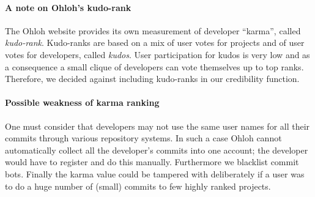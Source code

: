 \paragraph{A note on Ohloh's kudo-rank}
The Ohloh website provides its own measurement of developer ``karma'', called \emph{kudo-rank}. Kudo-ranks are based on a mix of user votes for projects and of user votes for developers, called \emph{kudos}. User participation for kudos is very low and as a consequence a small clique of developers can vote themselves up to top ranks. Therefore, we decided against including kudo-ranks in our credibility function.

\paragraph{Possible weakness of karma ranking}
One must consider that developers may not use the same user names for all their commits through various repository systems. In such a case Ohloh cannot automatically collect all the developer's commits into one account; the developer would have to register and do this manually. Furthermore we blacklist commit bots. Finally the karma value could be tampered with deliberately if a user was to do a huge number of (small) commits to few highly ranked projects.

